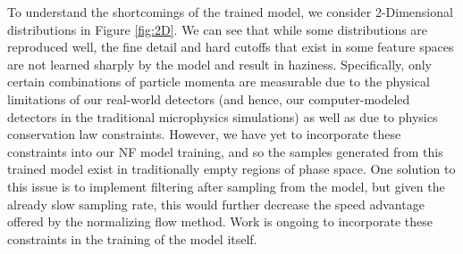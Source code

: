 To understand the shortcomings of the trained model, we consider 2-Dimensional distributions in  Figure \ref{fig:2D}. We can see that while some distributions are reproduced well, the fine detail and hard cutoffs that exist in some feature spaces are not learned sharply by the model and result in haziness. Specifically, only certain combinations of particle momenta are measurable due to the physical limitations of our real-world detectors (and hence, our computer-modeled detectors in the traditional microphysics simulations) as well as due to physics conservation law constraints. However, we have yet to incorporate these constraints into our NF model training, and so the samples generated from this trained model exist in traditionally empty regions of phase space. One solution to this issue is to implement filtering after sampling from the model, but given the already slow sampling rate, this would further decrease the speed advantage offered by the normalizing flow method. Work is ongoing to incorporate these constraints in the training of the model itself.


